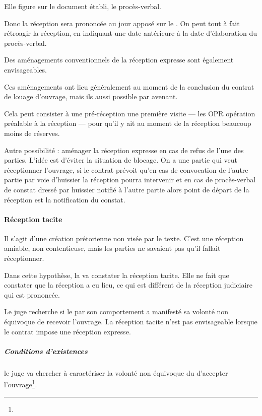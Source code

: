 			Elle figure sur le document établi, le procès-verbal.

			Donc la réception sera prononcée au jour apposé sur le \PV. On peut tout à fait rétroagir la réception, en indiquant une date antérieure à la date d'élaboration du procès-verbal.

			Des aménagements conventionnels de la réception expresse sont également envisageables.

			Ces aménagements ont lieu généralement au moment de la conclusion du contrat de louage d’ouvrage, mais ils aussi possible par avenant.

			Cela peut consister à une pré-réception \CAD une première visite --- les OPR opération préalable à la réception --- pour qu’il y ait au moment de la réception beaucoup moins de réserves.

			\medbreak Autre possibilité : aménager la réception expresse en cas de refus de l’une des parties. L’idée est d’éviter la situation de blocage. On a une partie qui veut réceptionner l’ouvrage, si le contrat prévoit qu’en cas de convocation de l’autre partie par voie d’huissier la réception pourra intervenir et en cas de procès-verbal de constat dressé par huissier notifié à l’autre partie alors point de départ de la réception est la notification du constat.

			\paragraph{Réception tacite}\label{receptionTacite}

			Il s'agit d'une création prétorienne non visée par le texte. C’est une réception amiable, non contentieuse, mais les parties ne savaient pas qu’il fallait réceptionner.

			Dans cette hypothèse, la \CourDeCas va constater la réception tacite. Elle ne fait que constater que la réception a eu lieu, ce qui est différent de la réception judiciaire qui est prononcée.

			Le juge recherche si le \MO par son comportement a manifesté sa volonté non équivoque de recevoir l’ouvrage. La réception tacite n’est pas envisageable lorsque le contrat impose une réception expresse.

			\subparagraph{Conditions d'existences}


			le juge va chercher à caractériser la volonté non équivoque du \MO d’accepter l’ouvrage\footnote{}.

